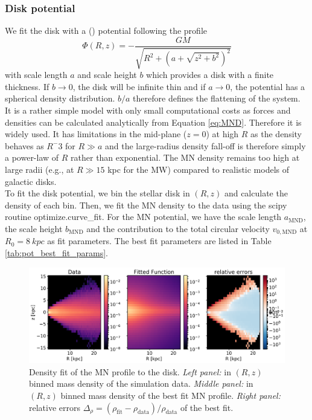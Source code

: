 \subsubsection{Disk potential}\label{subsubsec:disk_pot}
We fit the disk with a \citet{MNprofile} () potential following the profile 
\begin{equation}\label{eq:MND}
\Phi(R,z) = -\frac{GM}{\sqrt{R^2+(a+\sqrt{z^2+b^2})^2}}
\end{equation} 
with scale length $a$ and scale height $b$ which provides a disk with a finite thickness. If $b\rightarrow 0$, the disk will be infinite thin and if $a \rightarrow 0$, the potential has a spherical density distribution. $b/a$ therefore defines the flattening of the system. It is a rather simple model with only small computational costs as forces and densities can be calculated analytically from Equation \ref{eq:MND}. Therefore it is widely used. It has limitations in the mid-plane ($z=0$) at high $R$ as the density behaves as $R^−3$ for $R\gg a$ and the large-radius density fall-off is therefore simply a power-law of $R$ rather than exponential. The \ac{MN} density remains too high at large radii (e.g., at $R\gg15$ kpc for the \ac{MW}) compared to realistic models of galactic disks. 
\\To fit the disk potential, we bin the stellar disk in $(R, z)$ and calculate the density of each bin. Then, we fit the \ac{MN} density to the data using the scipy \citep{scipy....2001} routine optimize.curve\_fit. For the \ac{MN} potential, we have the scale length $a_{\mathrm{MND}}$, the scale height $b_{\mathrm{MND}}$ and the contribution to the total circular velocity $v_{0, \mathrm{MND}}$ at $ R_0 = \SI{8}{kpc}$ as fit parameters. The best fit parameters are listed in Table \ref{tab:pot_best_fit_params}.
\begin{figure}[htbp]
\captionsetup{format=plain}
    \centering
    \includegraphics[width = \textwidth]{plots/Auriga/MND_best_fit_snap_127.png}
    \caption{Density fit of the \ac{MN} profile to the disk. \textit{Left panel:} in $(R,z)$ binned mass density of the simulation data. \textit{Middle panel:} in $(R,z)$ binned mass density of the best fit \ac{MN} profile. \textit{Right panel:} relative errors \(\Delta_\rho = (\rho_{\mathrm{fit}}- \rho_{\mathrm{data}})/\rho_{\mathrm{data}}\) of the best fit.}
    \label{fig:MND}
\end{figure}
